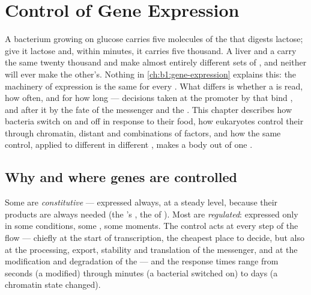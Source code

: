 \chapter{Control of Gene Expression}\label{ch:b1:expression-control}

A bacterium growing on glucose carries five molecules of the 
that digests lactose; give it lactose and, within minutes, it carries
five thousand. A liver  and a  carry the same twenty
thousand  and make almost entirely different sets of ,
and neither will ever make the other's. Nothing in
\cref{ch:b1:gene-expression} explains this: the machinery of
expression is the same for every . What differs is whether a 
is read, how often, and for how long --- decisions taken at the
promoter by  that bind , and after it by the fate of the
messenger and the . This chapter describes how bacteria switch
 on and off in response to their food, how eukaryotes control
their  through chromatin, distant  and combinations of
factors, and how the same control, applied to different  in
different , makes a body out of one .

\section{Why and where genes are controlled}

\begin{proposition}\label{prop:b1:expression-control:levels}
Some  are \emph{constitutive} --- expressed always, at a steady
level, because their products are always needed (the 's
, the  of ). Most are \emph{regulated}:
expressed only in some conditions, some , some moments. The
control acts at every step of the flow --- chiefly at the start of
transcription, the cheapest place to decide, but also at the
processing, export, stability and translation of the messenger, and
at the modification and degradation of the  --- and the
response times range from seconds (a  modified) through
minutes (a bacterial  switched on) to days (a chromatin state
changed).
\end{proposition}

